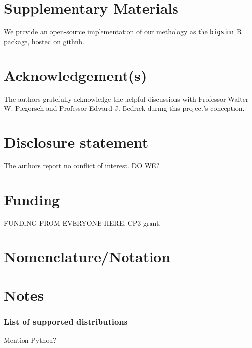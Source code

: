 \documentclass[
]{article}
\begin{document}
\hypertarget{supplementary-materials}{%
\section{Supplementary Materials}\label{supplementary-materials}}

We provide an open-source implementation of our methology as the \texttt{bigsimr} R package, hosted on github.

\hypertarget{acknowledgements}{%
\section{Acknowledgement(s)}\label{acknowledgements}}

The authors gratefully acknowledge the helpful discussions with Professor Walter W. Piegorsch and Professor Edward J. Bedrick during this project's conception.

\hypertarget{disclosure-statement}{%
\section{Disclosure statement}\label{disclosure-statement}}

The authors report no conflict of interest. DO WE?

\hypertarget{funding}{%
\section{Funding}\label{funding}}

FUNDING FROM EVERYONE HERE. CP3 grant.

\hypertarget{nomenclaturenotation}{%
\section{Nomenclature/Notation}\label{nomenclaturenotation}}

\hypertarget{notes}{%
\section{Notes}\label{notes}}

\hypertarget{list-of-supported-distributions}{%
\subsubsection{List of supported distributions}\label{list-of-supported-distributions}}

Mention Python?

  
\end{document}

